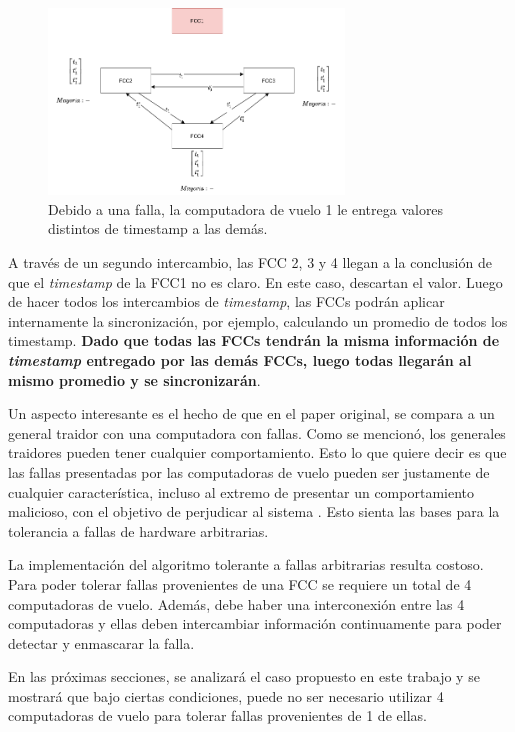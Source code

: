 \begin{figure}[H]
    \centering
    \includegraphics[width=0.7\textwidth]{img/Byzantine_Generals_Problem_6.png}
    \caption{Debido a una falla, la computadora de vuelo 1 le entrega valores distintos de timestamp a las demás.}
    \label{fig:Byzantine_Generals_Problem_6}
\end{figure}

A través de un segundo intercambio, las FCC 2, 3 y 4 llegan a la conclusión de que el \textit{timestamp} de la FCC1 no es claro. En este caso, descartan el valor. Luego de hacer todos los intercambios de \textit{timestamp}, las FCCs podrán aplicar internamente la sincronización, por ejemplo, calculando un promedio de todos los timestamp. \textbf{Dado que todas las FCCs tendrán la misma información de \textit{timestamp} entregado por las demás FCCs, luego todas llegarán al mismo promedio y se sincronizarán}.

Un aspecto interesante es el hecho de que en el paper original, se compara a un general traidor con una computadora con fallas. Como se mencionó, los generales traidores pueden tener cualquier comportamiento. Esto lo que quiere decir es que las fallas presentadas por las computadoras de vuelo pueden ser justamente de cualquier característica, incluso al extremo de presentar un comportamiento malicioso, con el objetivo de perjudicar al sistema \cite{lala1994architectural}. Esto sienta las bases para la tolerancia a fallas de hardware arbitrarias.

La implementación del algoritmo tolerante a fallas arbitrarias resulta costoso. Para poder tolerar fallas provenientes de una FCC se requiere un total de 4 computadoras de vuelo. Además, debe haber una interconexión entre las 4 computadoras y ellas deben intercambiar información continuamente para poder detectar y enmascarar la falla. 

En las próximas secciones, se analizará el caso propuesto en este trabajo y se mostrará que bajo ciertas condiciones, puede no ser necesario utilizar 4 computadoras de vuelo para tolerar fallas provenientes de 1 de ellas.